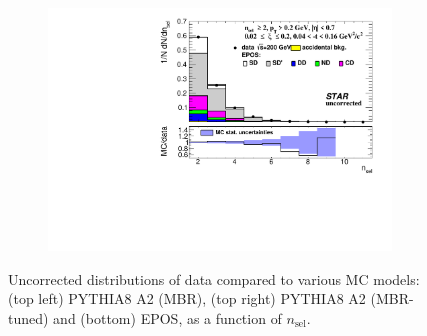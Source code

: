 \begin{figure}[H]
\begin{subfigure}{.45\textwidth}
		\includegraphics[width=\linewidth, page=1]{chapters/chrgSTAR/img/nonSD/chrg/SDT_epos_xi0_RP_starsim_nsel.pdf}
	\end{subfigure}
	\begin{minipage}{.45\textwidth}
		\caption{Uncorrected distributions of data compared to various MC models: (top left) PYTHIA8 A2 (MBR), (top right) PYTHIA8 A2 (MBR-tuned) and (bottom) EPOS, as a function of $n_{\mathrm{sel}}$.}
		\label{fig:nonSDnsel}
	\end{minipage}
	
\end{figure}

